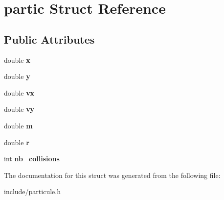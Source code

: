 \hypertarget{structpartic}{}\section{partic Struct Reference}
\label{structpartic}
\subsection*{Public Attributes}
\begin{DoxyCompactItemize}
\item 
double {\bfseries x}\hypertarget{structpartic_ad22b97eb8778ed68896fd20fc5c3d3ec}{}\label{structpartic_ad22b97eb8778ed68896fd20fc5c3d3ec}

\item 
double {\bfseries y}\hypertarget{structpartic_a10f546c12f4d11bd382e04836e1a82d3}{}\label{structpartic_a10f546c12f4d11bd382e04836e1a82d3}

\item 
double {\bfseries vx}\hypertarget{structpartic_aff91b63617a593e642bb29e0c79db060}{}\label{structpartic_aff91b63617a593e642bb29e0c79db060}

\item 
double {\bfseries vy}\hypertarget{structpartic_ad1e87b7d2e243cdad7e7eb1859e983a6}{}\label{structpartic_ad1e87b7d2e243cdad7e7eb1859e983a6}

\item 
double {\bfseries m}\hypertarget{structpartic_ad3c5ba0a6e769fbdceceaec7e45af518}{}\label{structpartic_ad3c5ba0a6e769fbdceceaec7e45af518}

\item 
double {\bfseries r}\hypertarget{structpartic_a85a5d6c4a3e2b5ae2b83b58c9a52e2aa}{}\label{structpartic_a85a5d6c4a3e2b5ae2b83b58c9a52e2aa}

\item 
int {\bfseries nb\+\_\+collisions}\hypertarget{structpartic_a64eeee71e229631dc48dbfab7b975560}{}\label{structpartic_a64eeee71e229631dc48dbfab7b975560}

\end{DoxyCompactItemize}


The documentation for this struct was generated from the following file\+:\begin{DoxyCompactItemize}
\item 
include/particule.\+h\end{DoxyCompactItemize}
